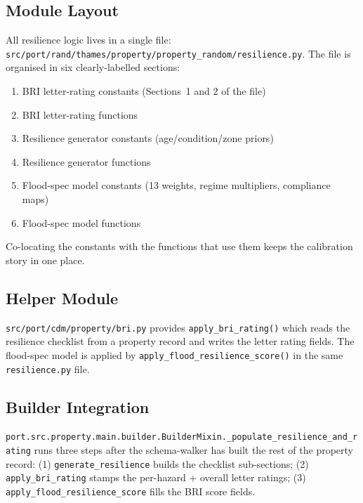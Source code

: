 \documentclass[11pt,a4paper]{article}
\begin{document}
\mkmimplementation

\subsection{Module Layout}
All resilience logic lives in a single file:
\texttt{src/port/rand/thames/property/property\_random/resilience.py}. The file is
organised in six clearly-labelled sections:

\begin{enumerate}[nosep]
    \item BRI letter-rating constants (Sections~1 and 2 of the file)
    \item BRI letter-rating functions
    \item Resilience generator constants (age/condition/zone priors)
    \item Resilience generator functions
    \item Flood-spec model constants (13 weights, regime multipliers, compliance maps)
    \item Flood-spec model functions
\end{enumerate}

\noindent Co-locating the constants with the functions that use them keeps the
calibration story in one place.

\subsection{Helper Module}
\texttt{src/port/cdm/property/bri.py} provides \texttt{apply\_bri\_rating()} which
reads the resilience checklist from a property record and writes the letter rating
fields. The flood-spec model is applied by
\texttt{apply\_flood\_resilience\_score()} in the same \texttt{resilience.py} file.

\subsection{Builder Integration}
\texttt{port.src.property.main.builder.BuilderMixin.\_populate\_resilience\_and\_rating}
runs three steps after the schema-walker has built the rest of the property record:
(1) \texttt{generate\_resilience} builds the checklist sub-sections;
(2) \texttt{apply\_bri\_rating} stamps the per-hazard + overall letter ratings;
(3) \texttt{apply\_flood\_resilience\_score} fills the BRI score fields.
\end{document}
